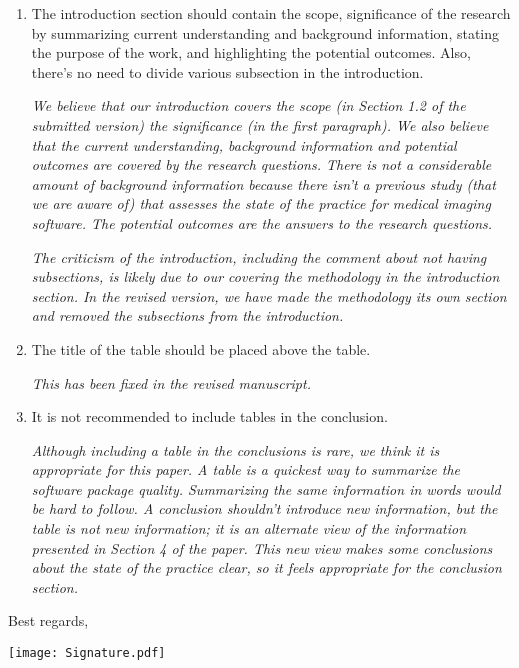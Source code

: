 \documentclass[12pt]{casletter}
\begin{document}
\begin{letter}
\begin{enumerate}
  \item The introduction section should contain the scope, significance of the
  research by summarizing current understanding and background information,
  stating the purpose of the work, and highlighting the potential outcomes.
  Also, there's no need to divide various subsection in the introduction.
  \medskip

  \emph{We believe that our introduction covers the scope (in Section 1.2 of the
  submitted version) the significance (in the first paragraph).  We also believe
  that the current understanding, background information and potential outcomes
  are covered by the research questions. There is not a considerable amount of
  background information because there isn't a previous study (that we are aware
  of) that assesses the state of the practice for medical imaging software. The
  potential outcomes are the answers to the research questions. \smallskip}

  \emph{The criticism of the introduction, including the comment about not
  having subsections, is likely due to our covering the methodology in the
  introduction section. In the revised version, we have made the methodology its
  own section and removed the subsections from the introduction. \smallskip}

  \item The title of the table should be placed above the table. \medskip

  \emph{This has been fixed in the revised manuscript.  \smallskip}

  \item It is not recommended to include tables in the conclusion. \medskip

  \emph{Although including a table in the conclusions is rare, we think it is
  appropriate for this paper.  A table is a quickest way to summarize the
  software package quality.  Summarizing the same information in words would be
  hard to follow.  A conclusion shouldn't introduce new information, but the
  table is not new information; it is an alternate view of the information
  presented in Section 4 of the paper.  This new view makes some conclusions
  about the state of the practice clear, so it feels appropriate for the
  conclusion section. \smallskip}

  \end{enumerate}

  \closing{Best regards,~\newline} \vspace{-29mm}
  \texttt{[image: Signature.pdf]}

\end {letter}
\end{document}
